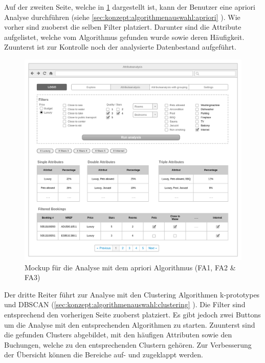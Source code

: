 Auf der zweiten Seite, welche in \cref{fig:konzept:mockups:apriori} dargestellt ist, kann der Benutzer eine apriori Analyse durchführen (siehe \cref{sec:konzept:algorithmenauswahl:apriori} ). Wie vorher sind zuoberst die selben Filter platziert. Darunter sind die Attribute aufgelistet, welche vom Algorithmus gefunden wurde sowie deren Häufigkeit. Zuunterst ist zur Kontrolle noch der analysierte Datenbestand aufgeführt.
\begin{figure}[H]
	\RawFloats
	\centering
	\includegraphics[width=1\textwidth]{images/wireframe-apriori}
	\caption{Mockup für die Analyse mit dem apriori Algorithmus (FA1, FA2 \& FA3)}
	\label{fig:konzept:mockups:apriori}
\end{figure}

Der dritte Reiter führt zur Analyse mit den Clustering Algorithmen k-prototypes und DBSCAN (\cref{sec:konzept:algorithmenauswahl:clustering} ). Die Filter sind entsprechend den vorherigen Seite zuoberst platziert. Es gibt jedoch zwei Buttons um die Analyse mit den entsprechenden Algorithmen zu starten. Zuunterst sind die gefunden Clusters abgebildet, mit den häufigen Attributen sowie den Buchungen, welche zu den entsprechenden Clustern gehören. Zur Verbesserung der Übersicht können die Bereiche auf- und zugeklappt werden.

